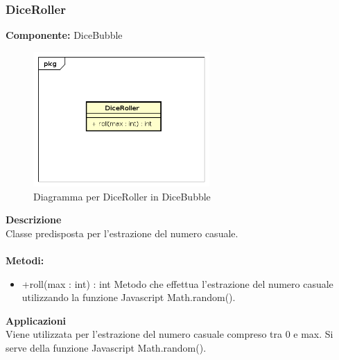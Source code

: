 \clearpage

\subsubsection{DiceRoller}
\textbf{Componente:}  DiceBubble\\
   \FloatBarrier
   \begin{figure}[ht]
   \centering
   \includegraphics[width=0.6\textwidth]{img/single-DiceRoller}
   \caption{{Diagramma per DiceRoller in DiceBubble}}
\end{figure}
\FloatBarrier
\textbf{Descrizione}\\
Classe predisposta per l'estrazione del numero casuale.
\\
\\
\textbf{Metodi:} 
\begin{itemize}
\item +roll(max : int) : int
Metodo che effettua l'estrazione del numero casuale utilizzando la funzione Javascript Math.random().
\end{itemize} 


\textbf{Applicazioni}\\
Viene utilizzata per l'estrazione del numero casuale compreso tra 0 e max. Si serve della funzione Javascript Math.random(). 


\clearpage

